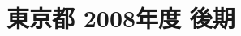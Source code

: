 \documentclass[../../hsm_tok_q.tex]{subfiles}
\begin{document}
    \section{東京都 2008年度 後期}
    \subsection{　}
    
    \newpage
    \subsection{　}
    
    \newpage
    \subsection{　}
    
    \newpage
    \subsection{　}
    
    \newpage
    \subsection{　}
    
\end{document}
